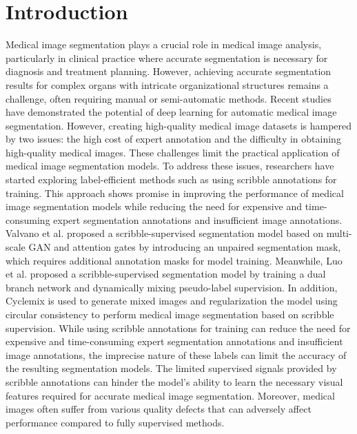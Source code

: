\documentclass[sigconf,natbib=false]{acmart}
\begin{document}

\maketitle
\vspace{-4mm}
\section{Introduction}
Medical image segmentation plays a crucial role in medical image analysis, particularly in clinical practice where accurate segmentation is necessary for diagnosis and treatment planning. However, achieving accurate segmentation results for complex organs with intricate organizational structures remains a challenge, often requiring manual or semi-automatic methods. Recent studies have demonstrated the potential of deep learning for automatic medical image segmentation. However, creating high-quality medical image datasets is hampered by two issues: the high cost of expert annotation and the difficulty in obtaining high-quality medical images. These challenges limit the practical application of medical image segmentation models. To address these issues, researchers have started exploring label-efficient methods such as using scribble annotations for training. This approach shows promise in improving the performance of medical image segmentation models while reducing the need for expensive and time-consuming expert segmentation annotations and insufficient image annotations. Valvano et al. \cite{MAAG} proposed a scribble-supervised segmentation model based on multi-scale GAN and attention gates by introducing an unpaired segmentation mask, which requires additional annotation masks for model training. Meanwhile, Luo et al. \cite{luo2022scribble} proposed a scribble-supervised segmentation model by training a dual branch network and dynamically mixing pseudo-label supervision. In addition, Cyclemix \cite{Zhang_2022_CycleMix} is used to generate mixed images and regularization the model using circular consistency to perform medical image segmentation based on scribble supervision. While using scribble annotations for training can reduce the need for expensive and time-consuming expert segmentation annotations and insufficient image annotations, the imprecise nature of these labels can limit the accuracy of the resulting segmentation models. The limited supervised signals provided by scribble annotations can hinder the model's ability to learn the necessary visual features required for accurate medical image segmentation. Moreover, medical images often suffer from various quality defects that can adversely affect performance compared to fully supervised methods.
\end{document}
